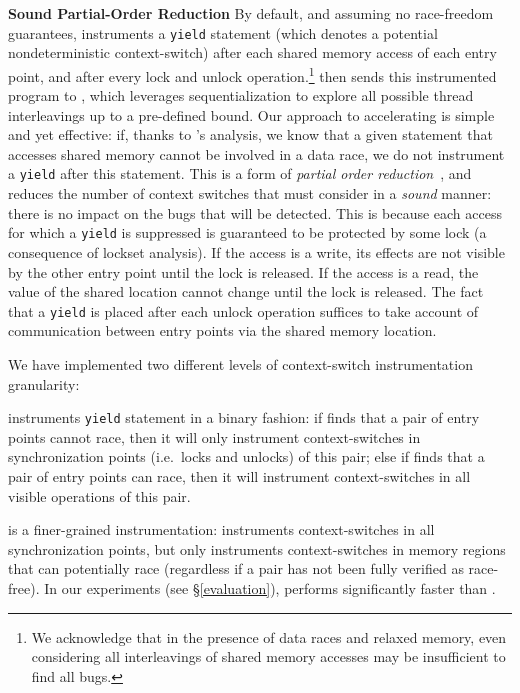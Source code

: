 \medskip\noindent\textbf{Sound Partial-Order Reduction }
%
By default, and assuming no race-freedom guarantees, \whoop instruments a \texttt{yield} statement (which denotes a potential nondeterministic context-switch) after each shared memory access of each entry point, and after every lock and unlock operation.\footnote{We acknowledge that in the presence of data races and relaxed memory, even considering all interleavings of shared memory accesses may be insufficient to find all bugs.} \whoop then sends this instrumented program to \corral, which leverages sequentialization to explore all possible thread interleavings up to a pre-defined bound. Our approach to accelerating \corral is simple and yet effective: if, thanks to \whoop's analysis, we know that a given statement that accesses shared memory cannot be involved in a data race, we do not instrument a \texttt{yield} after this statement.  This is a form of \emph{partial order reduction}~\cite{DBLP:books/sp/Godefroid96}, and reduces the number of context switches that \corral must consider in a \emph{sound} manner: there is no impact on the bugs that will be detected.  This is because each access for which a \texttt{yield} is suppressed is guaranteed to be protected by some lock (a consequence of lockset analysis).  If the access is a write, its effects are not visible by the other entry point until the lock is released.  If the access is a read, the value of the shared location cannot change until the lock is released.  The fact that a \texttt{yield} is placed after each unlock operation suffices to take account of communication between entry points via the shared memory location.

We have implemented two different levels of context-switch instrumentation granularity:

\yieldcoarse instruments \texttt{yield} statement in a binary fashion: if \whoop
finds that a pair of entry points cannot race, then it will only instrument
context-switches in synchronization points (i.e.\ locks and unlocks) of this pair; else if \whoop finds
that a pair of entry points can race, then it will instrument context-switches
in all visible operations of this pair.

\yieldmr is a finer-grained instrumentation: \whoop instruments context-switches
in all synchronization points, but only instruments context-switches in memory
regions that can potentially race (regardless if a pair has not been fully
verified as race-free). In our experiments (see \S\ref{evaluation}),
\yieldmr performs significantly faster than \yieldcoarse.

